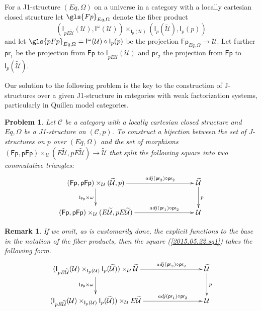 \documentclass[12pt]{article}
\numberwithin{equation}{section}
\newenvironment{eq}{\begin{equation}}{\end{equation}}
\newtheorem{remark}[proposition]{Remark}
\newtheorem{problem}[proposition]{Problem}
\newcommand{\sr}{\rightarrow}
\newcommand{\wt}{\widetilde}
\newcommand{\dd}{\diamond}
\newcommand{\C}{{\mathcal C}}  %
\newcommand{\id}{1}            %
\newcommand{\U}{\mathcal{U}}
\newcommand{\I}{\mathsf{I}}
\newcommand{\Fp}{\mathsf{Fp}}
\newcommand{\pFp}{\mathsf{pFp}}
\newcommand{\pr}{\mathsf{pr}}
\begin{document}
For a J1-structure $(Eq,\Omega)$ on a universe in a category with a locally
cartesian closed structure let $\gls{Fp}_{Eq,\Omega}$ denote the fiber product
%
$$(\I_{pE\wt{\U}}(\U), \I^{\omega}(\U)) \times_{\I_p(\U)} (\I_p(\wt{\U}), \I_p(p))$$
%
and let $\gls{pFp}_{Eq,\Omega}=\I^{\omega}(\U)\dd \I_p(p)$ be the projection
$\Fp_{Eq,\Omega}\sr \U$. Let further $\pr_1$ be the projection from $\Fp$ to
$\I_{pE\wt{\U}}(\U)$ and $\pr_2$ the projection from $\Fp$ to $\I_p(\wt{\U})$.

Our solution to the following problem is the key to the construction of
J-structures over a given J1-structure in categories with weak factorization
systems, particularly in Quillen model categories.
%
\begin{problem}
\label{2015.05.12.l1} Let $\C$ be a category with a locally cartesian
closed structure and $Eq,\Omega$ be a J1-structure on $({\C},p)$. To
construct a bijection between the set of J-structures on $p$ over $(Eq,\Omega)$
and the set of morphisms $(\Fp,\pFp)\times_\U(E\wt{\U},pE\wt{\U})\sr \wt{\U}$ that
split the following square into two commutative triangles:
%
\begin{eq}\label{2015.05.22.sq1}
\begin{xy}
          \xymatrix@C=7pc{ (\Fp,\pFp)\times_\U(\wt{\U},p) \ar[r]^-{adj(\pr_2)\circ
              \pr_2} \ar[d]_{\id_{\Fp}\times \omega} & \wt{\U}
            \ar[d]^{p}\\ (\Fp,\pFp)\times_\U(E\wt{\U},pE\wt{\U})
            \ar[r]^-{adj(\pr_1)\circ \pr_2} & \U }
\end{xy}
\end{eq}%
%
\end{problem}
%
\begin{remark}\rm
If we omit, as is customarily done, the explicit functions to the base in the
notation of the fiber products, then the square (\ref{2015.05.22.sq1}) takes the
following form.
%
\begin{eq}\label{2017.08.16.sq1}
\begin{xy}
          \xymatrix@C=7pc{ (\I_{pE\wt{\U}}(\U)\times_{\I_p(\U)}
            \I_p(\wt{\U}))\times_\U\wt{\U} \ar[r]^-{adj(\pr_2)\circ \pr_2}
            \ar[d]_{\id_{\Fp}\times \omega} & \wt{\U}
            \ar[d]^{p}\\ (\I_{pE\wt{\U}}(\U)\times_{\I_p(\U)} \I_p(\wt{\U}))\times_\U
            E\wt{\U} \ar[r]^-{adj(\pr_1)\circ \pr_2} & \U }
\end{xy}
\end{eq}%




\end{remark}
\end{document}
